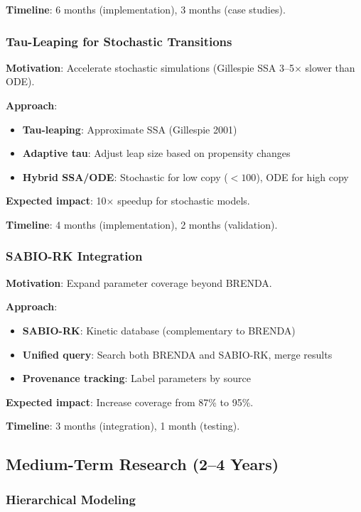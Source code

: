 \textbf{Timeline}: 6 months (implementation), 3 months (case studies).

\subsubsection{Tau-Leaping for Stochastic Transitions}

\textbf{Motivation}: Accelerate stochastic simulations (Gillespie SSA 3--5$\times$ slower than ODE).

\textbf{Approach}:
\begin{itemize}
    \item \textbf{Tau-leaping}: Approximate SSA (Gillespie 2001)
    \item \textbf{Adaptive tau}: Adjust leap size based on propensity changes
    \item \textbf{Hybrid SSA/ODE}: Stochastic for low copy ($< 100$), ODE for high copy
\end{itemize}

\textbf{Expected impact}: 10$\times$ speedup for stochastic models.

\textbf{Timeline}: 4 months (implementation), 2 months (validation).

\subsubsection{SABIO-RK Integration}

\textbf{Motivation}: Expand parameter coverage beyond BRENDA.

\textbf{Approach}:
\begin{itemize}
    \item \textbf{SABIO-RK}: Kinetic database (complementary to BRENDA)
    \item \textbf{Unified query}: Search both BRENDA and SABIO-RK, merge results
    \item \textbf{Provenance tracking}: Label parameters by source
\end{itemize}

\textbf{Expected impact}: Increase coverage from 87\% to 95\%.

\textbf{Timeline}: 3 months (integration), 1 month (testing).

\subsection{Medium-Term Research (2--4 Years)}
\label{subsec:medium-term}

\subsubsection{Hierarchical Modeling}

